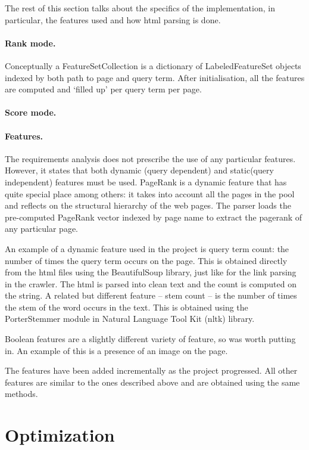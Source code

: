 \documentclass[12pt,twoside,notitlepage]{report}
\begin{document}
The rest of this section talks about the specifics of the implementation, in
particular, the features used and how html parsing is done.

\paragraph{Rank mode.}
Conceptually a FeatureSetCollection is a dictionary of LabeledFeatureSet
objects indexed by both path to page and  query term. After initialisation, all
the features are computed and `filled up' per query term per page.

\paragraph{Score mode.}
\paragraph{Features.}


The requirements analysis does not prescribe the use of any particular
features. However, it states that both dynamic (query dependent) and
static(query independent) features must be used. PageRank is a dynamic feature
that has quite special place among others: it takes into account all the pages
in the pool and reflects on the structural hierarchy of the web pages. 
The parser loads the pre-computed PageRank vector indexed by page name to
extract the pagerank of any particular page.

An example of a dynamic feature used in the project is query term count: the
number of times the query term occurs on the page. This is obtained directly
from the html files using the BeautifulSoup library, just like for the link
parsing in the crawler. The html is parsed into clean text and the count is
computed on the string.
A related but different feature -- stem count -- is the number of times the
stem of the word occurs in the text. This is obtained using the PorterStemmer
module in Natural Language Tool Kit (nltk) library.

Boolean features are a slightly different variety of feature, so was worth
putting in. An example of this is a presence of an image on the page.

The features have been added incrementally as the project progressed. All other
features are similar to the ones described above and are obtained using the
same methods.


\section{Optimization}
\end{document}
